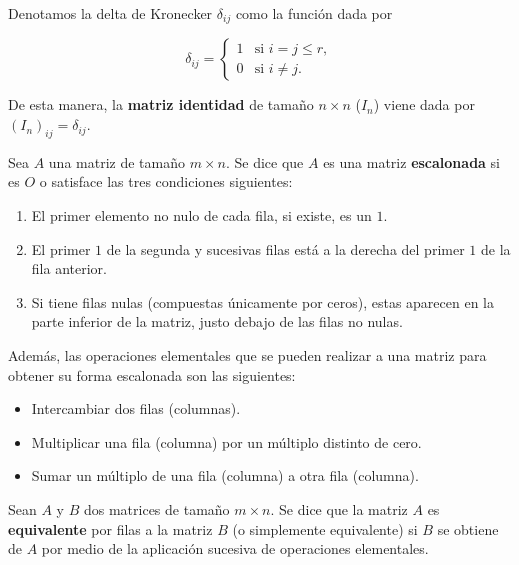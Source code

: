 Denotamos la delta de Kronecker $\delta_{ij}$ como la función dada por

\[
    \delta_{ij} =
    \begin{cases}
        1 & \text{si } i = j \leq r, \\
        0 & \text{si } i \neq j.
    \end{cases}
\]

De esta manera, la \textbf{matriz identidad} de tamaño $n \times n$ ($I_{n}$) viene dada por $(I_n)_{ij} = \delta_{ij}$.\newline

\begin{definicion}
    Sea $A$ una matriz de tamaño $m \times n$. Se dice que $A$ es una matriz \textbf{escalonada} si es $O$ o satisface las tres condiciones siguientes:

    \begin{enumerate}
        \item El primer elemento no nulo de cada fila, si existe, es un $1$.
        \item El primer $1$ de la segunda y sucesivas filas está a la derecha del primer $1$ de la fila anterior.
        \item Si tiene filas nulas (compuestas únicamente por ceros), estas aparecen en la parte inferior de la matriz, justo debajo de las filas no nulas.\newline
    \end{enumerate}

    Además, las operaciones elementales que se pueden realizar a una matriz para obtener su forma escalonada son las siguientes:

    \begin{itemize}
        \item Intercambiar dos filas (columnas).
        \item Multiplicar una fila (columna) por un múltiplo distinto de cero.
        \item Sumar un múltiplo de una fila (columna) a otra fila (columna).\newline
    \end{itemize}
\end{definicion}

\begin{definicion}
    Sean $A$ y $B$ dos matrices de tamaño $m \times n$. Se dice que la matriz $A$ es \textbf{equivalente} por filas a la matriz $B$ (o simplemente equivalente) si $B$ se obtiene de $A$ por medio de la aplicación sucesiva de operaciones elementales.\newline
\end{definicion}

